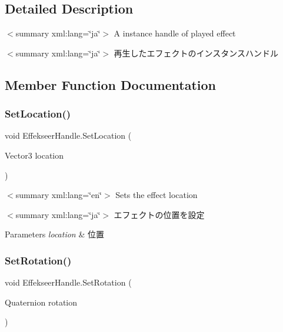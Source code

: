 \subsection{Detailed Description}
$<$summary xml\+:lang=\char`\"{}ja\char`\"{}$>$ A instance handle of played effect 

$<$summary xml\+:lang=\char`\"{}ja\char`\"{}$>$ 再生したエフェクトのインスタンスハンドル 

\subsection{Member Function Documentation}
\mbox{\label{struct_effekseer_handle_a65d631a161e475acac133b6db28d0070}} 
\subsubsection{\texorpdfstring{Set\+Location()}{SetLocation()}}
{\footnotesize\ttfamily void Effekseer\+Handle.\+Set\+Location (\begin{DoxyParamCaption}\item[{Vector3}]{location }\end{DoxyParamCaption})\hspace{0.3cm}{\ttfamily [inline]}}

$<$summary xml\+:lang=\char`\"{}en\char`\"{}$>$ Sets the effect location 

$<$summary xml\+:lang=\char`\"{}ja\char`\"{}$>$ エフェクトの位置を設定 


\begin{DoxyParams}{Parameters}
{\em location} & 位置\\
\hline
\end{DoxyParams}
\mbox{\label{struct_effekseer_handle_a54be425dc9d059e66fe00799f34e25cf}} 
\subsubsection{\texorpdfstring{Set\+Rotation()}{SetRotation()}}
{\footnotesize\ttfamily void Effekseer\+Handle.\+Set\+Rotation (\begin{DoxyParamCaption}\item[{Quaternion}]{rotation }\end{DoxyParamCaption})\hspace{0.3cm}{\ttfamily [inline]}}

